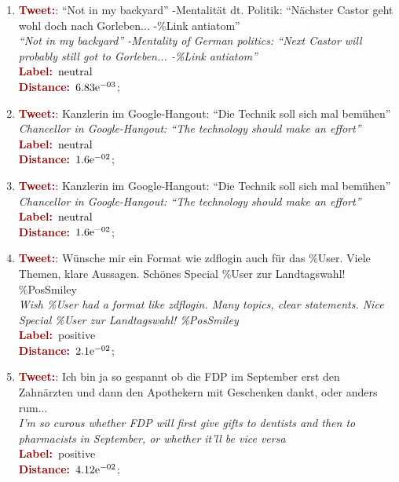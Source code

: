 \begin{enumerate}
\item \textcolor{darkred}{\bfseries Tweet:}: ``Not in my backyard'' -Mentalit\"at dt. Politik: ``N\"achster Castor geht wohl doch nach Gorleben... -\%Link antiatom''\\
  \textit{``Not in my backyard'' -Mentality of German politics: ``Next Castor will probably still got to Gorleben... -\%Link antiatom''}\\
  \textcolor{darkred}{\bfseries Label:}~\textcolor{black}{neutral}\\
  \textcolor{darkred}{\bfseries Distance:}~${6.83}\mathrm{e}^{-03}$;

\item \textcolor{darkred}{\bfseries Tweet:}: Kanzlerin im Google-Hangout: ``Die Technik soll sich mal bem\"uhen''\\
  \textit{Chancellor in Google-Hangout: ``The technology should make an effort''}\\
  \textcolor{darkred}{\bfseries Label:}~\textcolor{black}{neutral}\\
  \textcolor{darkred}{\bfseries Distance:}~${1.6}\mathrm{e}^{-02}$;\label{snt:cgsa:exmp:kolchyna-error-0.1}

\item \textcolor{darkred}{\bfseries Tweet:}: Kanzlerin im Google-Hangout: ``Die Technik soll sich mal bem\"uhen''\\
  \textit{Chancellor in Google-Hangout: ``The technology should make an effort''}\\
  \textcolor{darkred}{\bfseries Label:}~\textcolor{black}{neutral}\\
  \textcolor{darkred}{\bfseries Distance:}~${1.6}\mathrm{e}^{-02}$;\label{snt:cgsa:exmp:kolchyna-error-0.2}

\item \textcolor{darkred}{\bfseries Tweet:}: W\"unsche mir ein Format wie zdflogin auch f\"ur das \%User. Viele Themen, klare Aussagen. Sch\"ones Special \%User zur Landtagswahl! \%PosSmiley\\
  \textit{Wish \%User had a format like zdflogin. Many topics, clear statements. Nice Special \%User zur Landtagswahl! \%PosSmiley}\\
  \textcolor{darkred}{\bfseries Label:}~\textcolor{green3}{positive}\\
  \textcolor{darkred}{\bfseries Distance:}~${2.1}\mathrm{e}^{-02}$;

\item \textcolor{darkred}{\bfseries Tweet:}: Ich bin ja so gespannt ob die FDP im September erst den Zahn\"arzten und dann den Apothekern mit Geschenken dankt, oder anders rum...\\
  \textit{I'm so curous whether FDP will first give gifts to dentists and then to pharmacists in September, or whether it'll be vice versa}\\
  \textcolor{darkred}{\bfseries Label:}~\textcolor{green3}{positive}\\
  \textcolor{darkred}{\bfseries Distance:}~${4.12}\mathrm{e}^{-02}$;
\end{enumerate}

